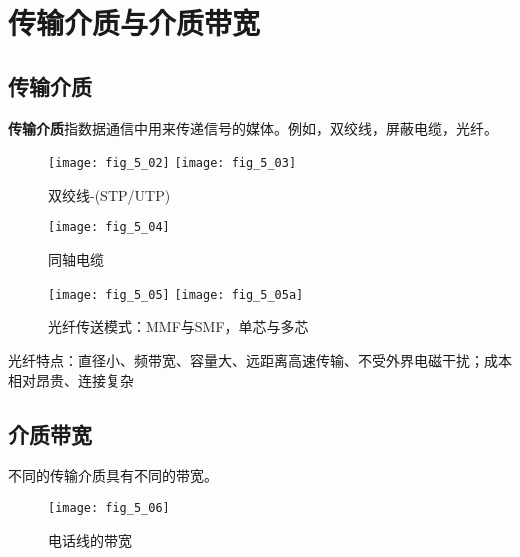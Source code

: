 \section{传输介质与介质带宽}

\subsection{传输介质}

\textbf{传输介质}指数据通信中用来传递信号的媒体。例如，双绞线，屏蔽电缆，光纤。



\begin{center}
\begin{figure}
  \centering
  \texttt{[image: fig\_5\_02]}
  \texttt{[image: fig\_5\_03]}\\
  \caption{双绞线-(STP/UTP)}\label{fig_5_03}
\end{figure}
\end{center}



\begin{center}
\begin{figure}
  \centering
  \texttt{[image: fig\_5\_04]}\\
  \caption{同轴电缆}\label{fig_5_04}
\end{figure}
\end{center}



\begin{center}
\begin{figure}
  \centering
  \texttt{[image: fig\_5\_05]}
  \texttt{[image: fig\_5\_05a]}
  \caption{光纤传送模式：MMF与SMF，单芯与多芯}\label{fig_5_05}
\end{figure}
\end{center}


\begin{remark}
光纤特点：直径小、频带宽、容量大、远距离高速传输、不受外界电磁干扰；成本相对昂贵、连接复杂
\end{remark}


\subsection{介质带宽}

不同的传输介质具有不同的带宽。


\begin{center}
\begin{figure}
  \centering
  \texttt{[image: fig\_5\_06]}\\
  \caption{电话线的带宽}\label{fig_5_06}
\end{figure}
\end{center}


